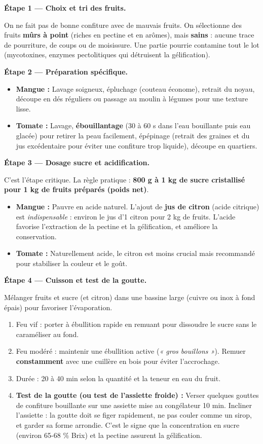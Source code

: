 \documentclass[11pt]{article}
\begin{document}
\textbf{Étape 1 — Choix et tri des fruits.}\par
On ne fait pas de bonne confiture avec de mauvais fruits. On sélectionne des fruits \textbf{mûrs à point} (riches en pectine et en arômes), mais \textbf{sains} : aucune trace de pourriture, de coups ou de moisissure. Une partie pourrie contamine tout le lot (mycotoxines, enzymes pectolitiques qui détruisent la gélification).

\textbf{Étape 2 — Préparation spécifique.}\par
\begin{itemize}
    \item \textbf{Mangue :} Lavage soigneux, épluchage (couteau économe), retrait du noyau, découpe en dés réguliers ou passage au moulin à légumes pour une texture lisse.
    \item \textbf{Tomate :} Lavage, \textbf{ébouillantage} (30 à 60 s dans l'eau bouillante puis eau glacée) pour retirer la peau facilement, épépinage (retrait des graines et du jus excédentaire pour éviter une confiture trop liquide), découpe en quartiers.
\end{itemize}

\textbf{Étape 3 — Dosage sucre et acidification.}\par
C'est l'étape critique. La règle pratique : \textbf{800 g à 1 kg de sucre cristallisé pour 1 kg de fruits préparés (poids net)}.
\begin{itemize}
    \item \textbf{Mangue :} Pauvre en acide naturel. L'ajout de \textbf{jus de citron} (acide citrique) est \emph{indispensable} : environ le jus d'1 citron pour 2 kg de fruits. L'acide favorise l'extraction de la pectine et la gélification, et améliore la conservation.
    \item \textbf{Tomate :} Naturellement acide, le citron est moins crucial mais recommandé pour stabiliser la couleur et le goût.
\end{itemize}

\textbf{Étape 4 — Cuisson et test de la goutte.}\par
Mélanger fruits et sucre (et citron) dans une bassine large (cuivre ou inox à fond épais) pour favoriser l'évaporation.
\begin{enumerate}
    \item Feu vif : porter à ébullition rapide en remuant pour dissoudre le sucre sans le caraméliser au fond.
    \item Feu modéré : maintenir une ébullition active (\emph{« gros bouillons »}). Remuer \textbf{constamment} avec une cuillère en bois pour éviter l'accrochage.
    \item Durée : 20 à 40 min selon la quantité et la teneur en eau du fruit.
    \item \textbf{Test de la goutte (ou test de l'assiette froide) :} Verser quelques gouttes de confiture bouillante sur une assiette mise au congélateur 10 min. Incliner l'assiette : la goutte doit se figer rapidement, ne pas couler comme un sirop, et garder sa forme arrondie. C'est le signe que la concentration en sucre (environ 65-68 \% Brix) et la pectine assurent la gélification.
\end{enumerate}
\end{document}
